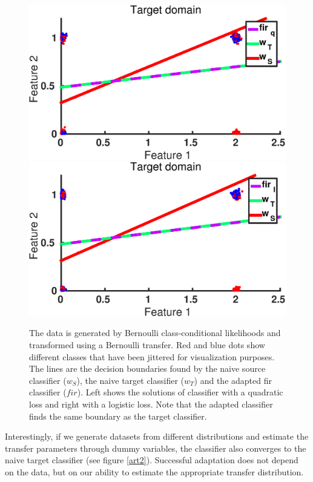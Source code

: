\documentclass[twoside,11pt]{article}
\begin{document}
\begin{figure}[ht]
\centering
\includegraphics[width=.45\textwidth]{images/da_artexp_sens_model_convergence_Bern_square.eps} \hspace{5px}
\includegraphics[width=.45\textwidth]{images/da_artexp_sens_model_convergence_Bern_log.eps}
\caption{The data is generated by Bernoulli class-conditional likelihoods and transformed using a Bernoulli transfer. Red and blue dots show different classes that have been jittered for visualization purposes. The lines are the decision boundaries found by the naive source classifier ($w_{S}$), the naive target classifier ($w_{T}$) and the adapted fir classifier ($fir$). Left shows the solutions of classifier with a quadratic loss and right with a logistic loss. Note that the adapted classifier finds the same boundary as the target classifier.}
\label{art1}
\end{figure}

Interestingly, if we generate datasets from different distributions and estimate the transfer parameters through dummy variables, the classifier also converges to the naive target classifier (see figure \ref{art2}). Successful adaptation does not depend on the data, but on our ability to estimate the appropriate transfer distribution. 
\end{document}
